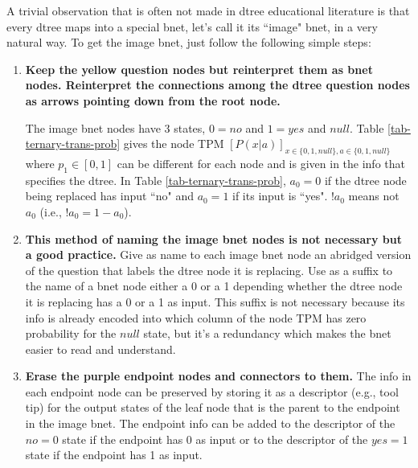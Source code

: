 A trivial 
observation
that is often not made
in dtree educational literature
is that every dtree 
maps into a special bnet, 
let's call it
its ``image" bnet,
in a very natural way.
To get the
 image bnet, just follow the
following simple steps:
\begin{enumerate}
\item {\bf Keep
the yellow question nodes
but reinterpret them as bnet nodes.
Reinterpret the connections among
the dtree question nodes
 as arrows pointing
down from the root node.}

The image bnet nodes
have 3 states,  $0=no$ and
$1=yes$ and $null$.
Table \ref{tab-ternary-trans-prob}
gives the 
node TPM $[P(x|a)]_{
x\in \{0,1,null\}, 
a\in \{0,1,null\}}$
where $p_1\in[0,1]$ can be 
different for each node and is given
in the info that specifies    
the dtree. In Table 
\ref{tab-ternary-trans-prob},
$a_0= 0$ if the
dtree node being replaced has input
``no" and $a_0=1$ if its 
input is ``yes".
$!a_0$ means not $a_0$ (i.e., $!a_0=1-a_0$).
\item
{\bf This method of naming
the image bnet nodes
is not necessary but a good practice.}
Give as name to each image bnet
node 
an abridged 
version of
the question
that labels the dtree node it is replacing.
Use as a suffix
to the name of a 
bnet node either a 0 or a 1
depending whether
the dtree node it is replacing
has a 0 or a 1 as input.
This suffix is not
necessary because its
info is already encoded
into
which column
of the node TPM has
zero probability for the
$null$ state, but
it's  a redundancy which makes
the bnet easier to read and understand.
\item {\bf Erase the purple endpoint
nodes and connectors to them.} The
info in each  endpoint node
can be preserved
by storing it
as a descriptor (e.g., tool tip)
for the output
states of the
leaf node that 
is the parent
to the endpoint 
in the image bnet.
The
endpoint info can
be added to the descriptor of
the $no=0$ state if the
endpoint has 0 as input 
or to the descriptor
of the $yes=1$ state if 
the endpoint has 1 as input.
\end{enumerate}

